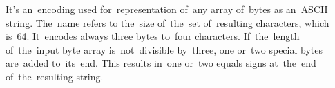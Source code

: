 \label{base64}
It's an~\hyperref[encoding]{encoding} used for~representation of~any array of~\hyperref[bitsbytes]{bytes} as an~\hyperref[ascii]{ASCII} string.
The~name refers to the~size of~the~set of~resulting characters, which is~64.
It~encodes always three bytes to~four characters.
If~the~length of~the~input byte array is~not~divisible by~three, one or~two special bytes are~added to~its~end.
This results in~one or~two equals signs at~the~end of~the~resulting string.
\newpage
